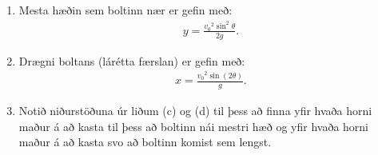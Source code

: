 \ifdefined \wholebook \else\documentclass[oneside]{book}\usepackage{EdlBook}\graphicspath{{figures/}}
\begin{document}
\begin{enumerate}[label = \textbf{Dæmi \thechapter.\arabic*.}]
\begin{enumerate}[label = \textbf{(\alph*)}]
    \item Mesta hæðin sem boltinn nær er gefin með:
    \begin{align*}
        y = \frac{{v_0}^2 \sin^2\theta}{2g}.
    \end{align*}
    
    \item Drægni boltans (lárétta færslan) er gefin með:
    \begin{align*}
        x = \frac{{v_0}^2 \sin(2\theta)}{g}.
    \end{align*}
    
    \item Notið niðurstöðuna úr liðum (c) og (d) til þess að finna yfir hvaða horni maður á að kasta til þess að boltinn nái mestri hæð og yfir hvaða horni maður á að kasta svo að boltinn komist sem lengst.
\end{enumerate}

\end{enumerate}


\ifdefined \wholebook \else
 \printindex
\end{document}
